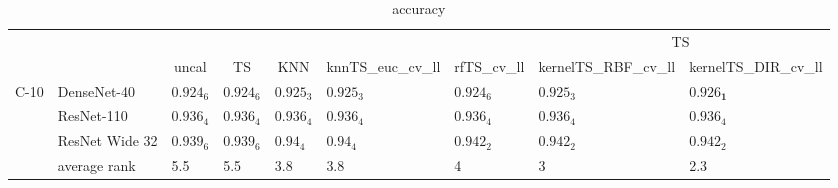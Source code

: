 \begin{table*}
\caption{accuracy}
\label{table:accuracy}
\centering
\begin{adjustbox}{width=\textwidth}

\begin{tabular}{lllllllll}
\toprule
\multicolumn{7}{c}{}&\multicolumn{2}{c}{TS}\\
\cmidrule{8-9}
\multicolumn{1}{c}{}&\multicolumn{1}{c}{}&\multicolumn{1}{c}{uncal}&\multicolumn{1}{c}{TS}&\multicolumn{1}{c}{KNN}&\multicolumn{1}{c}{knnTS_euc_cv_ll}&\multicolumn{1}{c}{rfTS_cv_ll}&\multicolumn{1}{c}{kernelTS_RBF_cv_ll}&\multicolumn{1}{c}{kernelTS_DIR_cv_ll}\\\midrule
C-10 & DenseNet-40 &  $0.924_{6}$ &  $0.924_{6}$ &  $0.925_{3}$ &     $0.925_{3}$ &  $0.924_{6}$ &        $0.925_{3}$ &  $\mathbf{0.926_{1}}$ \\
     & ResNet-110 &  $0.936_{4}$ &  $0.936_{4}$ &  $0.936_{4}$ &     $0.936_{4}$ &  $0.936_{4}$ &        $0.936_{4}$ &           $0.936_{4}$ \\
     & ResNet Wide 32 &  $0.939_{6}$ &  $0.939_{6}$ &   $0.94_{4}$ &      $0.94_{4}$ &  $0.942_{2}$ &        $0.942_{2}$ &           $0.942_{2}$ \\
\cmidrule{2-9}
     & average rank &          5.5 &          5.5 &          3.8 &             3.8 &            4 &                  3 &                   2.3 \\
\cmidrule{1-9}
\bottomrule
\end{tabular}


\end{adjustbox}
\end{table*}